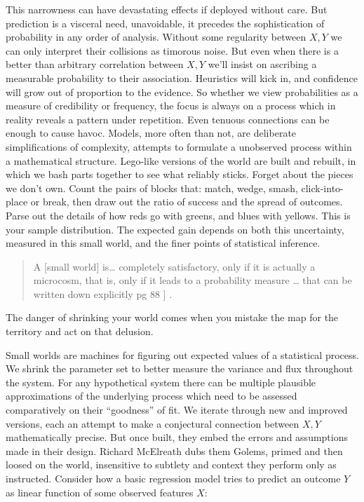 \documentclass[]{tufte-book}
\theoremstyle{definition}
\theoremstyle{definition}
\theoremstyle{definition}
\theoremstyle{remark}
\begin{document}
This narrowness can have devastating effects if deployed without care. But prediction is a visceral need, unavoidable, it precedes the sophistication of probability in any order of analysis. Without some regularity between \(X, Y\) we can only interpret their collisions as timorous noise. But even when there is a better than arbitrary correlation between \(X, Y\) we'll insist on ascribing a measurable probability to their association. Heuristics will kick in, and confidence will grow out of proportion to the evidence. So whether we view probabilities as a measure of credibility or frequency, the focus is always on a process which in reality reveals a pattern under repetition. Even tenuous connections can be enough to cause havoc. Models, more often than not, are deliberate simplifications of complexity, attempts to formulate a unobserved process within a mathematical structure. Lego-like versions of the world are built and rebuilt, in which we bash parts together to see what reliably sticks. Forget about the pieces we don't own. Count the pairs of blocks that: match, wedge, smash, click-into-place or break, then draw out the ratio of success and the spread of outcomes. Parse out the details of how reds go with greens, and blues with yellows. This is your sample distribution. The expected gain depends on both this uncertainty, measured in this small world, and the finer points of statistical inference.

\begin{quote}
A {[}small world{]} is\ldots{} completely satisfactory, only if it is actually a microcosm, that is, only if it leads to a probability measure \ldots{} that can be written down explicitly pg 88 \citep{savage54}{]} .
\end{quote}

The danger of shrinking your world comes when you mistake the map for the territory and act on that delusion.

Small worlds are machines for figuring out expected values of a statistical process. We shrink the parameter set to better measure the variance and flux throughout the system. For any hypothetical system there can be multiple plausible approximations of the underlying process which need to be assessed comparatively on their ``goodness'' of fit. We iterate through new and improved versions, each an attempt to make a conjectural connection between \(X, Y\) mathematically precise. But once built, they embed the errors and assumptions made in their design. Richard McElreath dubs them Golems, primed and then loosed on the world, insensitive to subtlety and context they perform only as instructed. Consider how a basic regression model tries to predict an outcome \(Y\) as linear function of some observed features \(X\):
\end{document}

